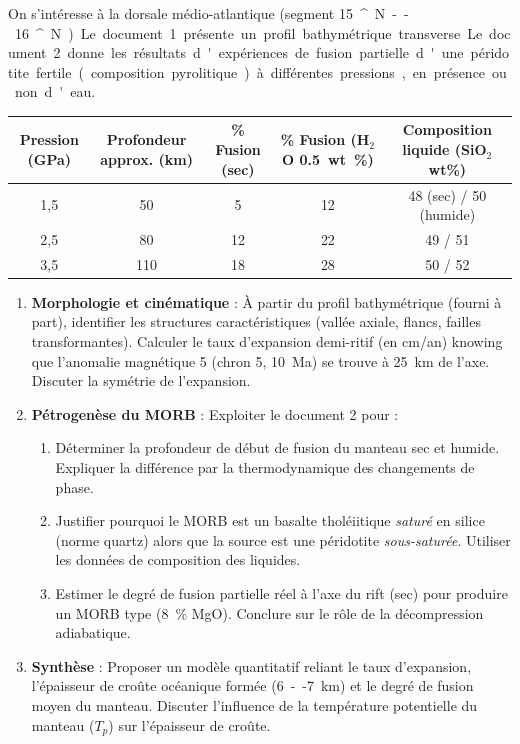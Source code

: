 \documentclass[11pt]{article}
\providecommand{\degree}{^{\circ}}
\begin{document}
\begin{exercice}
On s'intéresse à la dorsale médio-atlantique (segment \SI{15}{\degree}N -- \SI{16}{\degree}N). Le document 1 présente un profil bathymétrique transverse. Le document 2 donne les résultats d'expériences de fusion partielle d'une péridotite fertile (composition pyrolitique) à différentes pressions, en présence ou non d'eau.

\begin{center}
\begin{tabular}{|c|c|c|c|c|}
\hline
\textbf{Pression (GPa)} & \textbf{Profondeur approx. (km)} & \textbf{\% Fusion (sec)} & \textbf{\% Fusion (H$_2$O \SI{0,5}{wt\%})} & \textbf{Composition liquide (SiO$_2$ wt\%)} \\
\hline
1,5 & 50 & 5 & 12 & 48 (sec) / 50 (humide) \\
2,5 & 80 & 12 & 22 & 49 / 51 \\
3,5 & 110 & 18 & 28 & 50 / 52 \\
\hline
\end{tabular}
\end{center}

\begin{enumerate}
\item \textbf{Morphologie et cinématique} : À partir du profil bathymétrique (fourni à part), identifier les structures caractéristiques (vallée axiale, flancs, failles transformantes). Calculer le taux d'expansion demi-ritif (en cm/an) knowing que l'anomalie magnétique 5 (chron 5, \SI{10}{Ma}) se trouve à \SI{25}{km} de l'axe. Discuter la symétrie de l'expansion.
\item \textbf{Pétrogenèse du MORB} : Exploiter le document 2 pour :
      \begin{enumerate}
      \item Déterminer la profondeur de début de fusion du manteau sec et humide. Expliquer la différence par la thermodynamique des changements de phase.
      \item Justifier pourquoi le MORB est un basalte tholéiitique \textit{saturé} en silice (norme quartz) alors que la source est une péridotite \textit{sous-saturée}. Utiliser les données de composition des liquides.
      \item Estimer le degré de fusion partielle réel à l'axe du rift (sec) pour produire un MORB type (\SI{8}{\%} MgO). Conclure sur le rôle de la décompression adiabatique.
      \end{enumerate}
\item \textbf{Synthèse} : Proposer un modèle quantitatif reliant le taux d'expansion, l'épaisseur de croûte océanique formée (\SI{6}{--}\SI{7}{km}) et le degré de fusion moyen du manteau. Discuter l'influence de la température potentielle du manteau ($T_p$) sur l'épaisseur de croûte.
\end{enumerate}
\end{exercice}
\end{document}
